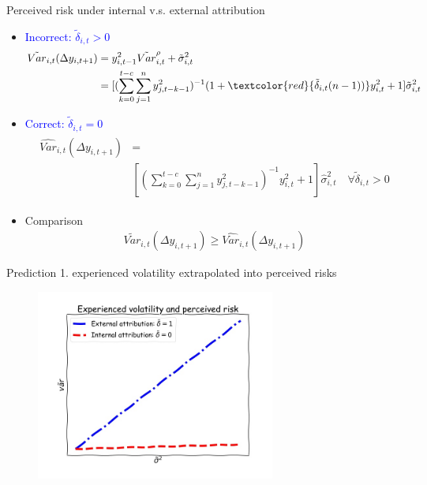\documentclass{beamer}
\begin{document}
\begin{frame}{Perceived risk under internal  v.s. external attribution}
	
	\begin{itemize}
		\item \textcolor{blue}{Incorrect: $\tilde \delta_{i,t} >0$}
	\begin{eqnarray}
	\begin{split}
	\tilde {Var}_{i,t}(\Delta y_{i,t+1}) & = y_{i,t-1}^2 \tilde{Var}^{\rho}_{i,t} + \tilde{\sigma}^2_{i,t} \\
	& = [(\sum^{t-c}_{k=0}\sum^{n}_{j=1}y^2_{j,t-k-1})^{-1}(1+\textcolor{red}{ \tilde\delta_{i,t}(n-1))}y^2_{i,t} + 1] \tilde{\sigma}^2_{i,t} 
	\end{split}
	\end{eqnarray}
		\item \textcolor{blue}{Correct: $\tilde \delta_{i,t} =0$}
		\begin{eqnarray}
	\begin{split}
	\widehat{Var}_{i,t}(\Delta y_{i,t+1}) & = \\
	& [(\sum^{t-c}_{k=0}\sum^{n}_{j=1}y^2_{j,t-k-1})^{-1}y^2_{i,t} + 1] \hat{\sigma}^2_{i,t} \quad \forall \tilde \delta_{i,t} >0
		\end{split}
	\end{eqnarray}
		\item Comparison 
		\begin{eqnarray}
		\tilde {Var}_{i,t}(\Delta y_{i,t+1}) \geq \widehat{Var}_{i,t}(\Delta y_{i,t+1})
		\end{eqnarray}
	\end{itemize}
	
\end{frame}

\begin{frame}{Prediction 1. experienced volatility extrapolated into perceived risks}
	\begin{figure}
		\centering 
		\label{var_experience_var}
		\includegraphics[width=0.7\textwidth]{figures/var_experience_var.jpg}
	\end{figure}
\end{frame}
\end{document}
